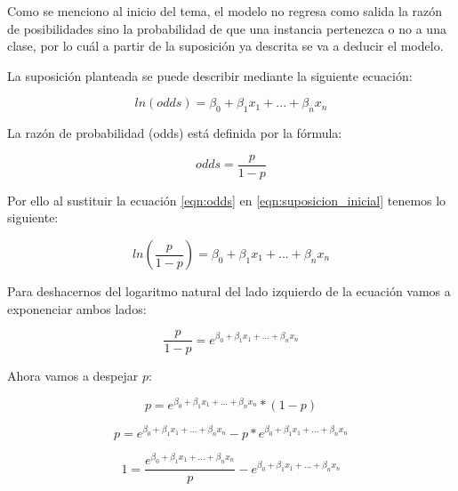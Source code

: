\documentclass[11pt,fleqn]{book} %
\begin{document}
Como se menciono al inicio del tema, el modelo no regresa como salida la razón de posibilidades sino la probabilidad de que una instancia pertenezca o no a una clase, por lo cuál a partir de la suposición ya descrita se va a deducir el modelo.

La suposición planteada se puede describir mediante la siguiente ecuación:

\begin{equation}
ln (odds) = \beta_0 + \beta_1 x_1 + ... + \beta_n x_n
\label{eqn:suposicion_inicial} 
\end{equation}

La razón de probabilidad (odds) está definida por la fórmula:


\begin{equation}
odds = \frac{p}{1-p}
\label{eqn:odds} 
\end{equation}

Por ello al sustituir la ecuación \ref{eqn:odds} en \ref{eqn:suposicion_inicial} tenemos lo siguiente:

\begin{equation}
ln ( \frac{p}{1-p}) = \beta_0 + \beta_1 x_1 + ... + \beta_n x_n
\label{eqn:suposicion_inicial_mod} 
\end{equation}

Para deshacernos del logaritmo natural del lado izquierdo de la ecuación vamos a exponenciar ambos lados:

\begin{equation}
\frac{p}{1-p} = e^{\beta_0 + \beta_1 x_1 + ... + \beta_n x_n}
\label{eqn:suposicion_inicial_mod2} 
\end{equation}

Ahora vamos a despejar $p$:

\begin{equation}
p = e^{\beta_0 + \beta_1 x_1 + ... + \beta_n x_n} * (1-p)
\label{eqn:suposicion_inicial_mod3} 
\end{equation}

\begin{equation}
p = e^{\beta_0 + \beta_1 x_1 + ... + \beta_n x_n} - p  * e^{\beta_0 + \beta_1 x_1 + ... + \beta_n x_n}
\label{eqn:suposicion_inicial_mod4} 
\end{equation}

\begin{equation}
1 = \frac{e^{\beta_0 + \beta_1 x_1 + ... + \beta_n x_n}}{p} - e^{\beta_0 + \beta_1 x_1 + ... + \beta_n x_n}
\label{eqn:suposicion_inicial_mod5} 
\end{equation}
\end{document}
